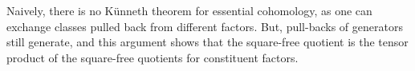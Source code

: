 \documentclass{article}
\theoremstyle{plain}
\theoremstyle{definition}
\newcommand{\dfh}[1]{ \color{blue} DFH: { #1} \color{black}}
\newcommand{\Z}{\mathbb{Z}}
\newcommand{\alt}{\mathcal{A}}
\begin{document}
Naively, there is no K\"unneth theorem for essential cohomology, as
one can exchange classes pulled back from different factors.  But, pull-backs of generators still generate,
and this argument shows that the square-free quotient is  the tensor product of the square-free quotients
for constituent factors.

    



\end{document}
